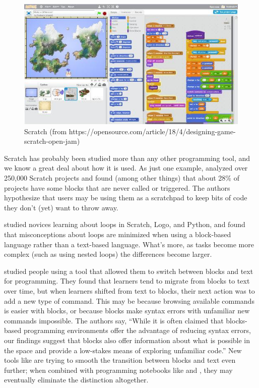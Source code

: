 \begin{figure}
\centering
\includegraphics{../../figures/scratch.jpg}
\caption{Scratch (from https://opensource.com/article/18/4/designing-game-scratch-open-jam)}
\label{f:pck-scratch}
\end{figure}

Scratch has probably been studied more than any other programming tool,
and we know a great deal about how it is used. As just one example,
\cite{Aiva2016} analyzed over 250,000 Scratch projects and found
(among other things) that about 28\% of projects have some blocks that
are never called or triggered. The authors hypothesize that users may be
using them as a scratchpad to keep bits of code they don't (yet) want to
throw away.

\cite{Grov2017,Mlad2017} studied novices learning about loops in
Scratch, Logo, and Python, and found that misconceptions about loops are
minimized when using a block-based language rather than a text-based
language. What's more, as tasks become more complex (such as using
nested loops) the differences become larger.

\cite{Wein2017a} studied people using a tool that allowed them to
switch between blocks and text for programming. They found that
learners tend to migrate from blocks to text over time, but when
learners shifted from text to blocks, their next action was to add a
new type of command. This may be because browsing available commands
is easier with blocks, or because blocks make syntax errors with
unfamiliar new commands impossible. The authors say, ``While it is
often claimed that blocks-based programming environments offer the
advantage of reducing syntax errors, our findings suggest that blocks
also offer information about what is possible in the space and provide
a low-stakes means of exploring unfamiliar code.'' New tools like
 are trying to smooth the transition between blocks
and text even further; when combined with programming notebooks like
 and , they may eventually
eliminate the distinction altogether.

